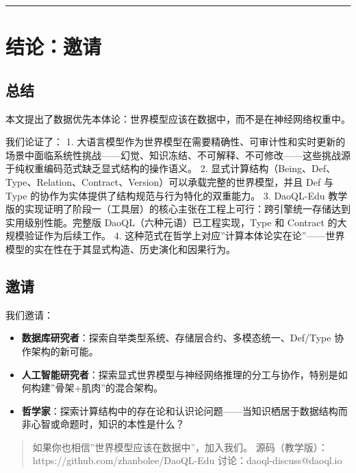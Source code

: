 \documentclass[11pt,a4paper]{ctexart}
\begin{document}
\begin{center}\rule{0.5\linewidth}{0.5pt}\end{center}

\section{结论：邀请}\label{ux7ed3ux8bbaux9080ux8bf7}

\subsection{总结}\label{ux603bux7ed3}

本文提出了数据优先本体论：世界模型应该在数据中，而不是在神经网络权重中。

我们论证了： 1.
大语言模型作为世界模型在需要精确性、可审计性和实时更新的场景中面临系统性挑战------幻觉、知识冻结、不可解释、不可修改------这些挑战源于纯权重编码范式缺乏显式结构的操作语义。
2.
显式计算结构（Being、Def、Type、Relation、Contract、Version）可以承载完整的世界模型，并且
Def 与 Type 的协作为实体提供了结构规范与行为特化的双重能力。 3.
DaoQL-Edu
教学版的实现证明了阶段一（工具层）的核心主张在工程上可行：跨引擎统一存储达到实用级别性能。完整版
DaoQL（六种元语）已工程实现，Type 和 Contract 的大规模验证作为后续工作。
4.
这种范式在哲学上对应''计算本体论实在论''------世界模型的实在性在于其显式构造、历史演化和因果行为。

\subsection{邀请}\label{ux9080ux8bf7}

我们邀请：

\begin{itemize}
\tightlist
\item
  \textbf{数据库研究者}：探索自举类型系统、存储层合约、多模态统一、Def/Type
  协作架构的新可能。
\item
  \textbf{人工智能研究者}：探索显式世界模型与神经网络推理的分工与协作，特别是如何构建''骨架+肌肉''的混合架构。
\item
  \textbf{哲学家}：探索计算结构中的存在论和认识论问题------当知识栖居于数据结构而非心智或命题时，知识的本性是什么？
\end{itemize}

\begin{quote}
如果你也相信''世界模型应该在数据中''，加入我们。
源码（教学版）：https://github.com/zhanbolee/DaoQL-Edu
讨论：daoql-discuss@daoql.io
\end{quote}
\end{document}
